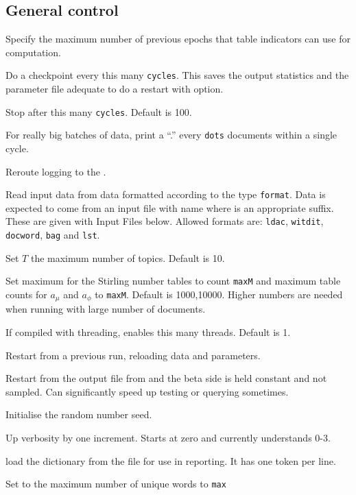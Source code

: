 \documentclass[a4paper,english]{article}
\begin{document}
\subsection{General control}
\begin{Description}\setlength{\itemsep}{0cm}
\item[\OptArg{-b}{epochs}] 
Specify the maximum number of previous epochs that table indicators can use for computation.
\item[\OptArg{-c}{cycles}] 
Do a checkpoint every this many \texttt{cycles}.
This saves the output statistics and the parameter file
adequate to do a restart with  option.
\item[\OptArg{-C}{cycles}] 
Stop after this many \texttt{cycles}.
Default is 100. 
\item[\OptArg{-d}{dots}] 
For really big batches of data, print a 
``.'' every \texttt{dots} documents within a single cycle.
\item[\Opt{-e}]
Reroute logging to the .
\item[\OptArg{-f}{format}] 
Read input data from data formatted according to
the type \texttt{format}.  Data is expected to come from
an input file with name  where
 is an appropriate suffix.
These are given with Input Files below.
Allowed formats are:
\texttt{ldac}, \texttt{witdit}, \texttt{docword}, 
\texttt{bag}
and \texttt{lst}.
\item[\OptArg{-K}{topics}] 
Set $T$ the maximum number of topics.
Default is 10.
\item[\OptArg{-N}{maxN,maxM}] 
Set maximum for the Stirling number tables
to count \texttt{maxM} and maximum table counts for $a_{\mu}$ and $a_{\phi}$ to \texttt{maxM}.
Default is 1000,10000. Higher numbers are needed when running with large number of documents.
\item[\OptArg{-q}{threads}] If compiled with threading, enables
this many threads.  Default is 1.
\item[\Opt{-r}]
Restart from a previous run, reloading data and parameters.
\item[\OptArg{-R}]
Restart from the output file from 
and the beta side is held constant and not sampled.
Can significantly speed up testing or querying sometimes.
\item[\OptArg{-s}{seed}]
Initialise the random number seed.
\item[\OptArg{-v}] Up verbosity by one increment.
Starts at zero and currently understands 0-3.
\item[\Opt{-V}]  load the dictionary from the
 file for use in reporting.  It has one token per line.
\item[\OptArg{-W}{max}] Set to the maximum number of unique words to \texttt{max}
\end{Description}
\end{document}
